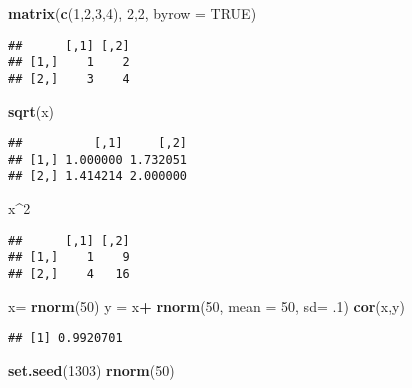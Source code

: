 \documentclass[]{article}
\newenvironment{Shaded}{\begin{snugshade}}{\end{snugshade}}
\newcommand{\KeywordTok}[1]{\textcolor[rgb]{0.13,0.29,0.53}{\textbf{#1}}}
\newcommand{\DataTypeTok}[1]{\textcolor[rgb]{0.13,0.29,0.53}{#1}}
\newcommand{\DecValTok}[1]{\textcolor[rgb]{0.00,0.00,0.81}{#1}}
\newcommand{\StringTok}[1]{\textcolor[rgb]{0.31,0.60,0.02}{#1}}
\newcommand{\OtherTok}[1]{\textcolor[rgb]{0.56,0.35,0.01}{#1}}
\newcommand{\OperatorTok}[1]{\textcolor[rgb]{0.81,0.36,0.00}{\textbf{#1}}}
\newcommand{\NormalTok}[1]{#1}
\begin{document}
\begin{Shaded}
\begin{Highlighting}[]
\KeywordTok{matrix}\NormalTok{(}\KeywordTok{c}\NormalTok{(}\DecValTok{1}\NormalTok{,}\DecValTok{2}\NormalTok{,}\DecValTok{3}\NormalTok{,}\DecValTok{4}\NormalTok{), }\DecValTok{2}\NormalTok{,}\DecValTok{2}\NormalTok{, }\DataTypeTok{byrow =} \OtherTok{TRUE}\NormalTok{)}
\end{Highlighting}
\end{Shaded}

\begin{verbatim}
##      [,1] [,2]
## [1,]    1    2
## [2,]    3    4
\end{verbatim}

\begin{Shaded}
\begin{Highlighting}[]
\KeywordTok{sqrt}\NormalTok{(x)}
\end{Highlighting}
\end{Shaded}

\begin{verbatim}
##          [,1]     [,2]
## [1,] 1.000000 1.732051
## [2,] 1.414214 2.000000
\end{verbatim}

\begin{Shaded}
\begin{Highlighting}[]
\NormalTok{x}\OperatorTok{^}\DecValTok{2}
\end{Highlighting}
\end{Shaded}

\begin{verbatim}
##      [,1] [,2]
## [1,]    1    9
## [2,]    4   16
\end{verbatim}

\begin{Shaded}
\begin{Highlighting}[]
\NormalTok{x=}\StringTok{ }\KeywordTok{rnorm}\NormalTok{(}\DecValTok{50}\NormalTok{)}
\NormalTok{y =}\StringTok{ }\NormalTok{x}\OperatorTok{+}\StringTok{ }\KeywordTok{rnorm}\NormalTok{(}\DecValTok{50}\NormalTok{, }\DataTypeTok{mean =} \DecValTok{50}\NormalTok{, }\DataTypeTok{sd=}\NormalTok{ .}\DecValTok{1}\NormalTok{)}
\KeywordTok{cor}\NormalTok{(x,y)}
\end{Highlighting}
\end{Shaded}

\begin{verbatim}
## [1] 0.9920701
\end{verbatim}

\begin{Shaded}
\begin{Highlighting}[]
\KeywordTok{set.seed}\NormalTok{(}\DecValTok{1303}\NormalTok{)}
\KeywordTok{rnorm}\NormalTok{(}\DecValTok{50}\NormalTok{)}
\end{Highlighting}
\end{Shaded}
\end{document}
